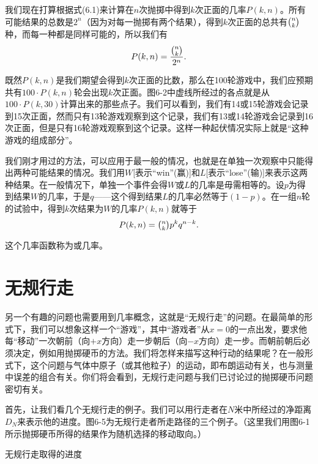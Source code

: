 \documentclass[12pt,oneside]{book}
\begin{document}
我们现在打算根据式(6.1)来计算在$n$次抛掷中得到$k$次正面的几率$P(k,n)$。所有可能结果的总数是$2^n$（因为对每一抛掷有两个结果），得到$k$次正面的总共有$\tbinom{n}{k}$种，而每一种都是同样可能的，所以我们有
\begin{equation}
\label{Eq:I:6:5}
P(k,n)=\frac{\tbinom{n}{k}}{2^n}.
\end{equation}

既然$P(k,n)$是我们期望会得到$k$次正面的比数，那么在100轮游戏中，我们应预期共有$100\cdot P(k,n)$轮会出现$k$次正面。图6-2中虚线所经过的各点就是从$100 \cdot P(k,30)$计算出来的那些点子。我们可以看到，我们有14或15轮游戏会记录到15次正面，然而只有13轮游戏观察到这个记录，我们有13或14轮游戏会记录到16次正面，但是只有16轮游戏观察到这个记录。这样一种起伏情况实际上就是“这种游戏的组成部分”。

我们刚才用过的方法，可以应用于最一般的情况，也就是在单独一次观察中只能得出两种可能结果的情况。我们用$W$[表示“win”(赢)]和$L$[表示“lose”(输)]来表示这两种结果。在一般情况下，单独一个事件会得$W$或$L$的几率是毋需相等的。设$p$为得到结果$W$的几率，于是$q$——这个得到结果$L$的几率必然等于$(1-p)$。在一组$n$轮的试验中，得到$k$次结果为$W$的几率$P(k,n)$就等于
\begin{equation}
\label{Eq:I:6:6}
P(k,n)=\tbinom{n}{k}p^kq^{n-k}.
\end{equation}

这个几率函数称为或几率。


\section{无规行走}
另一个有趣的问题也需要用到几率概念，这就是“无规行走”的问题。在最简单的形式下，我们可以想象这样一个“游戏”，其中“游戏者”从$x=0$的一点出发，要求他每“移动”一次朝前（向$+x$方向）走一步朝后（向$-x$方向）走一步。而朝前朝后必须决定，例如用抛掷硬币的方法。我们将怎样来描写这种行动的结果呢？在一般形式下，这个问题与气体中原子（或其他粒子）的运动，即布朗运动有关，也与测量中误差的组合有关。你们将会看到，无规行走问题与我们已讨论过的抛掷硬币问题密切有关。

首先，让我们看几个无规行走的例子。我们可以用行走者在$N$米中所经过的净距离$D_N$来表示他的进度。图6-5为无规行走者所走路径的三个例子。（这里我们用图6-1所示抛掷硬币所得的结果作为随机选择的移动取向。）


\begin{linefig}{无规行走取得的进度}
\caption{\footnotesize 无规行走取得的进度。横座标$N$表示所走的步子总数；纵座标$D_N$表示离开起点的净距离}
\label{fig:无规行走取得的进度}
\end{linefig}
\end{document}
